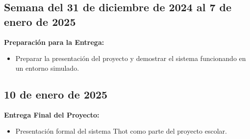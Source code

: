 \documentclass{report}
\begin{document}
    \subsection*{Semana del 31 de diciembre de 2024 al 7 de enero de 2025}
    \textbf{Preparación para la Entrega:}
    \begin{itemize}
        \item Preparar la presentación del proyecto y demostrar el sistema funcionando en un entorno simulado.
    \end{itemize}

    \subsection*{10 de enero de 2025}
    \textbf{Entrega Final del Proyecto:}
    \begin{itemize}
        \item Presentación formal del sistema Thot como parte del proyecto escolar.
    \end{itemize}
\end{document}
